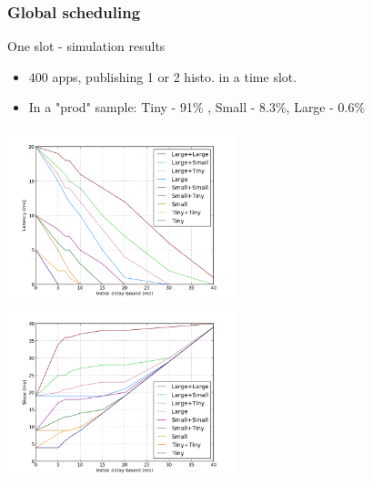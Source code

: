 \documentclass[]{prezentare}
\begin{document}
\begin{frame}
	\frametitle{Global scheduling}
	\begin{block}{One slot - simulation results}
	
	\begin{itemize}
	\item 400 apps, publishing 1 or 2 histo. in a time slot.
	\item In a "prod" sample: Tiny - 91\% , Small - 8.3\%, Large - 0.6\%
	\end{itemize}

	\vspace{-5mm}

	\begin{center}
	\includegraphics[width=0.5\textwidth]{../Images/one_slot_sim_latency}
	\includegraphics[width=0.5\textwidth]{../Images/one_slot_sim_skew}
	\end{center}
	\end{block}
\end{frame}
\end{document}
